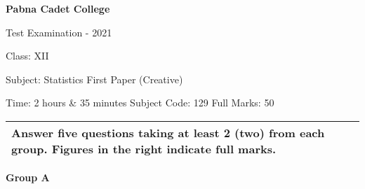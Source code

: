 \documentclass{article}
\begin{document}
\begin{center}
  \bfseries\large
  Pabna Cadet College

\normalsize
  Test Examination - 2021

  Class: XII

  Subject: Statistics First Paper (Creative)

  Time: 2 hours \& 35 minutes \qquad \qquad Subject Code: 129  \qquad  \qquad Full Marks: 50

\end{center}

\noindent
\begin{tabular}{p{\dimexpr\linewidth-2\tabcolsep}}
  Answer five questions taking at least 2 (two) from each group. Figures in the right indicate full marks.\\
  \hline
\end{tabular}

\begin{center}
\textbf{Group A}
\end{center}
\end{document}
